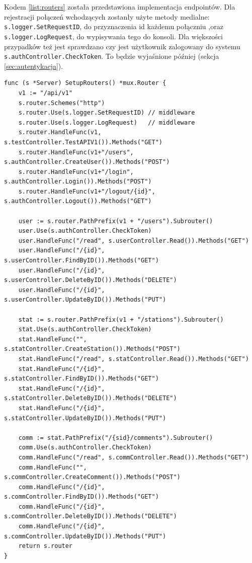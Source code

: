 Kodem \ref{list:routers} została przedstawiona implementacja endpointów.
Dla rejestracji połączeń wchodzących zostanły użyte metody medialne: \texttt{s.logger.SetRequestID}, do przyznaczenia id każdemu połączniu ,oraz \texttt{s.logger.LogRequest}, do wypisywania tego do konsoli.
Dla większości przypadków też jest sprawdzano czy jest użytkownik zalogowany do systemu \texttt{s.authController.CheckToken}. To będzie wyjaśnione później (sekcja \ref{sec:autentykacja}).
\begin{lstlisting}[label=list:routers,caption=Implementacja punktów końcowych,basicstyle=\tiny\ttfamily]
func (s *Server) SetupRouters() *mux.Router {
	v1 := "/api/v1"
	s.router.Schemes("http")
	s.router.Use(s.logger.SetRequestID) // middleware
	s.router.Use(s.logger.LogRequest)   // middleware
	s.router.HandleFunc(v1, s.testController.TestAPIV1()).Methods("GET")
	s.router.HandleFunc(v1+"/users", s.authController.CreateUser()).Methods("POST")
	s.router.HandleFunc(v1+"/login", s.authController.Login()).Methods("POST")
	s.router.HandleFunc(v1+"/logout/{id}", s.authController.Logout()).Methods("GET")

	user := s.router.PathPrefix(v1 + "/users").Subrouter()
	user.Use(s.authController.CheckToken)
	user.HandleFunc("/read", s.userController.Read()).Methods("GET")
	user.HandleFunc("/{id}", s.userController.FindByID()).Methods("GET")
	user.HandleFunc("/{id}", s.userController.DeleteByID()).Methods("DELETE")
	user.HandleFunc("/{id}", s.userController.UpdateByID()).Methods("PUT")

	stat := s.router.PathPrefix(v1 + "/stations").Subrouter()
	stat.Use(s.authController.CheckToken)
	stat.HandleFunc("", s.statController.CreateStation()).Methods("POST")
	stat.HandleFunc("/read", s.statController.Read()).Methods("GET")
	stat.HandleFunc("/{id}", s.statController.FindByID()).Methods("GET")
	stat.HandleFunc("/{id}", s.statController.DeleteByID()).Methods("DELETE")
	stat.HandleFunc("/{id}", s.statController.UpdateByID()).Methods("PUT")

	comm := stat.PathPrefix("/{sid}/comments").Subrouter()
	comm.Use(s.authController.CheckToken)
	comm.HandleFunc("/read", s.commController.Read()).Methods("GET")
	comm.HandleFunc("", s.commController.CreateComment()).Methods("POST")
	comm.HandleFunc("/{id}", s.commController.FindByID()).Methods("GET")
	comm.HandleFunc("/{id}", s.commController.DeleteByID()).Methods("DELETE")
	comm.HandleFunc("/{id}", s.commController.UpdateByID()).Methods("PUT")
	return s.router
}
\end{lstlisting}

